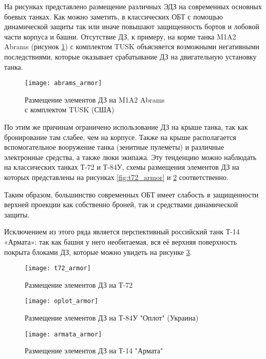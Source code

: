 На рисунках представлено размещение различных ЭДЗ на современных основных боевых танках.
Как можно заметить, в классических ОБТ с помощью динамической защиты так или иначе повышают защищенность бортов и лобовой части корпуса и башни. Отсутствие ДЗ, к примеру, на корме танка M1A2 Abrams (рисунок \ref{fig:abrams_armor}) с комплектом TUSK объясняется возможными негативными последствиями, которые оказывает срабатывание ДЗ на двигательную установку танка.
\begin{figure}[h]
	\texttt{[image: abrams\_armor]}
	\caption{Размещение элементов ДЗ на M1A2 Abrams\\с комплектом TUSK (США)}
	\label{fig:abrams_armor}
\end{figure}

По этим же причинам ограничено использование ДЗ на крыше танка, так как бронирование там слабее, чем на корпусе. Также на крыше располагается вспомогательное вооружение танка (зенитные пулеметы) и различные электронные средства, а также люки экипажа. Эту тенденцию можно наблюдать на классических танках Т-72 и Т-84У, схемы размещения элементов ДЗ на которых представлены на рисунках \ref{fig:t72_armor} и \ref{fig:oplot_armor} соответственно.

Таким образом, большинство современных ОБТ имеет слабость в защищенности верхней проекции как собственно броней, так и средствами динамической защиты.

Исключением из этого ряда является перспективный российский танк Т-14 «Армата»: так как башня у него необитаемая, вся её верхняя поверхность покрыта блоками ДЗ, которые можно увидеть на рисунке \ref{fig:armata_armor}.

\begin{figure}[h]
\begin{center}
	\begin{minipage}[h]{0.4\linewidth}
		\texttt{[image: t72\_armor]}
		\caption{Размещение элементов ДЗ на Т-72}
		\label{fig:t72_armor}
	\end{minipage}
	\begin{minipage}[h]{0.4\linewidth}
		\texttt{[image: oplot\_armor]}
		\caption{Размещение элементов ДЗ на Т-84У "Оплот" (Украина)}
		\label{fig:oplot_armor}
	\end{minipage}
\end{center}
\end{figure}

\begin{figure}[h]
\begin{center}
	\texttt{[image: armata\_armor]}
	\caption{Размещение элементов ДЗ на Т-14 "Армата"}
	\label{fig:armata_armor}
\end{center}
\end{figure}
